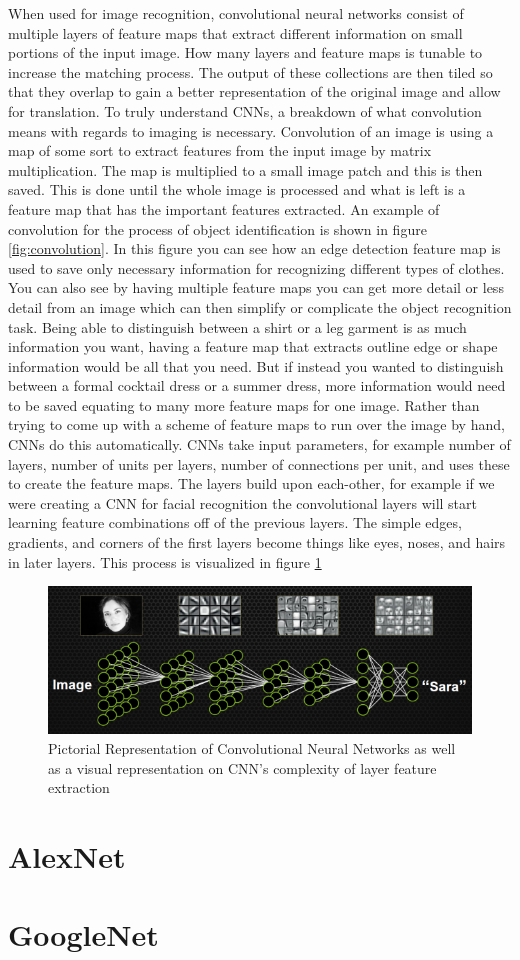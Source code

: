 When used for image recognition, convolutional neural networks consist of multiple layers of feature maps that extract different information on small portions of the input image. How many layers and feature maps is tunable to increase the matching process. The output of these collections are then tiled so that they overlap to gain a better representation of the original image and allow for translation. To truly understand CNNs, a breakdown of what convolution means with regards to imaging is necessary. Convolution of an image is using a map of some sort to extract features from the input image by matrix multiplication. The map is multiplied to a small image patch and this is then saved. This is done until the whole image is processed and what is left is a feature map that has the important features extracted. An example of convolution for the process of object identification is shown in figure \ref{fig:convolution}. In this figure you can see how an edge detection feature map is used to save only necessary information for recognizing different types of clothes. You can also see by having multiple feature maps you can get more detail or less detail from an image which can then simplify or complicate the object recognition task. Being able to distinguish between a shirt or a leg garment is as much information you want, having a feature map that extracts outline edge or shape information would be all that you need. But if instead you wanted to distinguish between a formal cocktail dress or a summer dress, more information would need to be saved equating to many more feature maps for one image. Rather than trying to come up with a scheme of feature maps to run over the image by hand, CNNs do this automatically. CNNs take input parameters, for example number of layers, number of units per layers, number of connections per unit, and uses these to create the feature maps. The layers build upon each-other, for example if we were creating a CNN for facial recognition the convolutional layers will start learning feature combinations off of the previous layers. The simple edges, gradients, and corners of the first layers become things like eyes, noses, and hairs in later layers. This process is visualized in figure \ref{fig:featuremaps} 

\begin{figure}[h!]
\centering
\includegraphics[width=.9\linewidth]{figs/facialDetection.png}
\caption{Pictorial Representation of Convolutional Neural Networks as well as a visual representation on CNN's complexity of layer feature extraction}
\label{fig:featuremaps}
\end{figure}

\section{AlexNet}
\section{GoogleNet}
